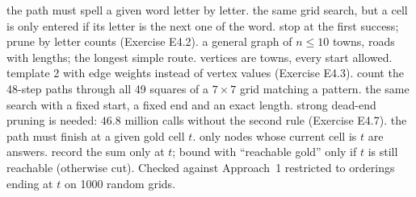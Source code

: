 \begin{variantsbox}
  {the path must spell a given word letter by letter.}
  {the same grid search, but a cell is only entered if its letter is the next one of the word.}
  {stop at the first success; prune by letter counts (Exercise E4.2).}
  {a general graph of $n \le 10$ towns, roads with lengths; the longest simple route.}
  {vertices are towns, every start allowed.}
  {template 2 with edge weights instead of vertex values (Exercise E4.3).}
  {count the 48-step paths through all 49 squares of a $7 \times 7$ grid matching a pattern.}
  {the same search with a fixed start, a fixed end and an exact length.}
  {strong dead-end pruning is needed: $46.8$ million calls without the second rule (Exercise E4.7).}
  {the path must finish at a given gold cell $t$.}
  {only nodes whose current cell is $t$ are answers.}
  {record the sum only at $t$; bound with ``reachable gold'' only if $t$ is still reachable (otherwise cut). Checked against Approach~1 restricted to orderings ending at $t$ on 1000 random grids.}
\end{variantsbox}
